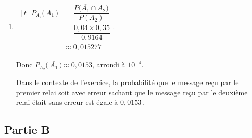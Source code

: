\documentclass[10pt]{article}
\providecommand{\np}[2][]{{#2~#1}}
\begin{document}
\begin{enumerate}
	On a donc bien :  $P\left(A_{2}\right)=\np{0,9164}$.
		
		\item      $\begin{aligned}[t] P_{A_{2}}\big( \,\overline{A_{1}}\,\big)&= \dfrac{P  \big( \overline{A_1} \cap A_2 \big) }{P\left(A_{2}\right)}\\
			&= \dfrac{ 0,04 \times 0,35}{0,9164}\\
			&\approx 0,015277
			\end{aligned}$.
		
		Donc $P_{A_{2}}\big(\,\overline{A_{1}}\,\big)  \approx 0,0153 $,  arrondi  à $10^{-4}$.
		
	Dans le contexte de	l'exercice, la probabilité que le message reçu par le premier relai soit avec erreur sachant que le message reçu par le deuxième relai était sans erreur est égale à $\np{0,0153}$. 
	\end{enumerate}


\subsection*{Partie B}
\end{document}
